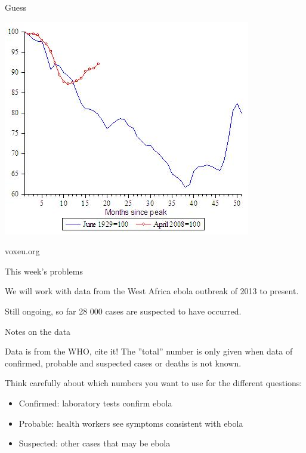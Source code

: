 \documentclass{beamer}
\begin{document}
\begin{frame}{Guess}

\begin{center}
\includegraphics[scale=0.7]{pics/wk2/dep_voxeu.jpg}
\end{center}

voxeu.org

\end{frame}


\begin{frame}{This week's problems}

We will work with data from the West Africa ebola outbreak of 2013 to present.

\vspace{5mm}

Still ongoing, so far 28 000 cases are suspected to have occurred.

\end{frame}


\begin{frame}{Notes on the data}

Data is from the WHO, cite it!  The ''total'' number is only given when data of confirmed, probable and suspected cases or deaths is not known.  

\vspace{5mm}

Think carefully about which numbers you want to use for the different questions:

\begin{itemize}
\item Confirmed: laboratory tests confirm ebola
\item Probable: health workers see symptoms consistent with ebola
\item Suspected: other cases that may be ebola
\end{itemize}

\end{frame}
\end{document}
